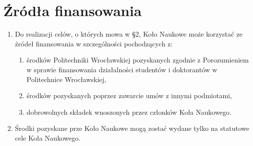 \documentclass[12pt,a4paper]{article}
\begin{document}
\section{Źródła finansowania}
    \begin{enumerate}
        \item Do realizacji celów, o których mowa w \S 2, Koło Naukowe może korzystać ze źródeł finansowania w szczególności pochodzących z:
            \begin{enumerate}
                \item środków Politechniki Wrocławskiej pozyskanych zgodnie z Porozumieniem \\ w sprawie finansowania działalności studentów i doktorantów w Politechnice Wrocławskiej,
                \item środków pozyskanych poprzez zawarcie umów z innymi podmiotami,
                \item dobrowolnych składek wnoszonych przez członków Koła Naukowego.
            \end{enumerate}
        \item Środki pozyskane prze Koło Naukowe mogą zostać wydane tylko na statutowe cele Koła Naukowego.
    \end{enumerate}
\end{document}
